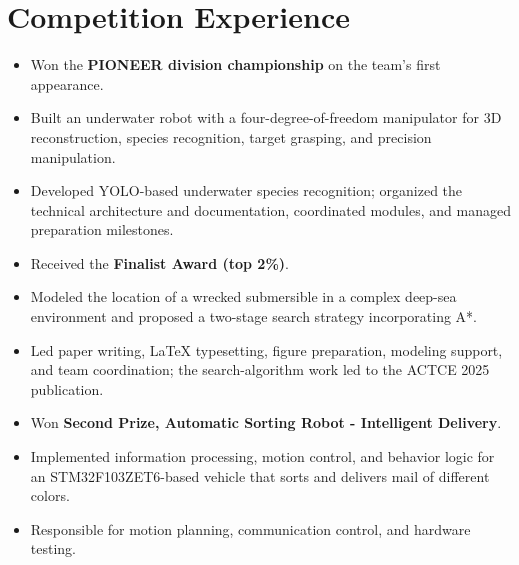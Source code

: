 \documentclass[10pt,a4paper]{article}
\begin{document}
\section{Competition Experience}
\begin{itemize}
  \item Won the \textbf{PIONEER division championship} on the team's first appearance.
  \item Built an underwater robot with a four-degree-of-freedom manipulator for 3D reconstruction, species recognition, target grasping, and precision manipulation.
  \item Developed YOLO-based underwater species recognition; organized the technical architecture and documentation, coordinated modules, and managed preparation milestones.
\end{itemize}
\begin{itemize}
  \item Received the \textbf{Finalist Award (top 2\%)}.
  \item Modeled the location of a wrecked submersible in a complex deep-sea environment and proposed a two-stage search strategy incorporating A*.
  \item Led paper writing, \LaTeX{} typesetting, figure preparation, modeling support, and team coordination; the search-algorithm work led to the ACTCE 2025 publication.
\end{itemize}
\begin{itemize}
  \item Won \textbf{Second Prize, Automatic Sorting Robot - Intelligent Delivery}.
  \item Implemented information processing, motion control, and behavior logic for an STM32F103ZET6-based vehicle that sorts and delivers mail of different colors.
  \item Responsible for motion planning, communication control, and hardware testing.
\end{itemize}
\end{document}
